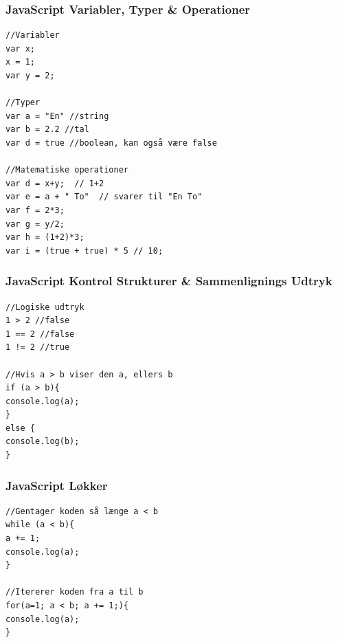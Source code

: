 \documentclass[10pt]{beamer}
\begin{document}
\begin{frame}[fragile]
 \frametitle{JavaScript Variabler, Typer \& Operationer}

\begin{lstlisting}
//Variabler
var x;
x = 1;
var y = 2;

//Typer
var a = "En" //string
var b = 2.2 //tal
var d = true //boolean, kan også være false

//Matematiske operationer
var d = x+y;  // 1+2
var e = a + " To"  // svarer til "En To"
var f = 2*3;
var g = y/2;
var h = (1+2)*3;
var i = (true + true) * 5 // 10;
\end{lstlisting}
\end{frame}

 
\begin{frame}[fragile]
\frametitle{JavaScript Kontrol Strukturer \& Sammenlignings Udtryk}
\begin{lstlisting}
//Logiske udtryk
1 > 2 //false
1 == 2 //false
1 != 2 //true

//Hvis a > b viser den a, ellers b
if (a > b){
console.log(a);
}
else {
console.log(b);
}
\end{lstlisting}
\end{frame}


\begin{frame}[fragile]
\frametitle{JavaScript Løkker}
\begin{lstlisting}
//Gentager koden så længe a < b
while (a < b){
a += 1;
console.log(a);
}

//Itererer koden fra a til b
for(a=1; a < b; a += 1;){
console.log(a);
}
\end{lstlisting}
\end{frame}
\end{document}
